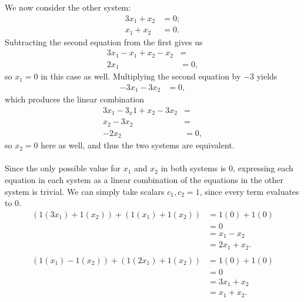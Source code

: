 \documentclass[12pt]{article}
\begin{document}
\begin{enumerate}
      We now consider the other system:
      \begin{align*}
        3x_1 + x_2 &= 0;\\
        x_1 + x_2 &= 0.
      \end{align*}
      Subtracting the second equation from the first gives us
      \begin{align*}
        3x_1 - x_1 + x_2 - x_2 &=\\
        2x_1 &= 0,
      \end{align*}
      so $x_1 = 0$ in this case as well. Multiplying the second
      equation by $-3$ yields
      \begin{align*}
        -3x_1 - 3x_2 &= 0,
      \end{align*}
      which produces the linear combination
      \begin{align*}
        3x_1 - 3_x1 + x_2 - 3x_2 &=\\
        x_2 - 3x_2 &=\\
        -2x_2 &= 0,
      \end{align*}
      so $x_2 = 0$ here as well, and thus the two systems are
      equivalent.\\\\
      Since the only possible value for $x_1$ and $x_2$ in both
      systems is $0$, expressing each equation in each system as
      a linear combination of the equations in the other system
      is trivial. We can simply take scalars $c_1, c_2 = 1$,
      since every term evaluates to $0$.
      \begin{align*}
        (1(3x_1) + 1(x_2)) + (1(x_1) + 1(x_2)) &= 1(0) + 1(0)\\
        &= 0\\
        &= x_1 - x_2\\
        &= 2x_1 + x_2.\\
        \\
        (1(x_1) - 1(x_2)) + (1(2x_1) + 1(x_2)) &= 1(0) + 1(0)\\
        &= 0\\
        &= 3x_1 + x_2\\
        &= x_1 + x_2.
      \end{align*}


\end{enumerate}
\end{document}
